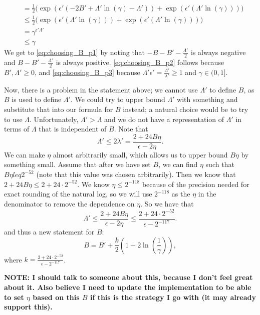 \documentclass[11pt]{scrartcl} %
\begin{document}
\begin{align}
							  &= \frac{1}{2} \bigg( \exp \left( \epsilon' \left( -2B' + \Lambda' \ln(\gamma) - \Lambda'  \right) \right) + \exp\left( \epsilon' \left( \Lambda' \ln(\gamma) \right) \right) \bigg) \nonumber \\
							  &\leq \frac{1}{2} \bigg( \exp \left( \epsilon' \left( \Lambda' \ln(\gamma)\right) \right) + \exp\left( \epsilon' \left( \Lambda' \ln(\gamma) \right) \right) \bigg) \label{eq:choosing_B_p2} \\
							  &= \gamma^{\epsilon' \Lambda'} \nonumber \\
							  &\leq \gamma \label{eq:choosing_B_p3}
\end{align}
We get to \eqref{eq:choosing_B_p1} by noting that $-B-B'-\frac{\Lambda'}{2}$ is always negative and
$B-B'-\frac{\Lambda'}{2}$ is always positive. \eqref{eq:choosing_B_p2} follows because
$B', \Lambda' \geq 0$, and \eqref{eq:choosing_B_p3} because
$\Lambda'\epsilon' = \frac{\Lambda'}{\lambda'} \geq 1$ and $\gamma \in (0,1]$. \newline

Now, there is a problem in the statement above; we cannot use $\Lambda'$ to define $B$, as $B$ is used
to define $\Lambda'$. We could try to upper bound $\Lambda'$ with something and substitute that into
our formula for $B$ instead; a natural choice would be to try to use $\Lambda$.
Unfortunately, $\Lambda' > \Lambda$ and we do not have a representation
of $\Lambda'$ in terms of $\Lambda$ that is independent of $B$.
Note that
\[ \Lambda' \leq 2\lambda' = \frac{2 + 24B\eta}{\epsilon - 2\eta}. \]
We can make $\eta$ almost arbitrarily small, which allows us to upper bound $B\eta$ by something small.
Assume that after we have set $B$, we can find $\eta$ such that $B\eta leq 2^{-52}$ (note that this
value was chosen arbitrarily). Then we know that $2 + 24B\eta \leq 2 + 24 \cdot 2^{-52}$.
We know $\eta \leq 2^{-118}$ because of the precision needed for exact rounding of the natural log,
so we will use $2^{-118}$ as the $\eta$ in the denominator to remove the dependence on $\eta$.
So we have that
\[ \Lambda' \leq \frac{2 + 24B\eta}{\epsilon-2\eta} \leq \frac{2+24 \cdot 2^{-52}}{\epsilon - 2^{-117}}. \]
and thus a new statement for $B$:
\[ B = B' + \frac{k}{2} \left(1 + 2\ln \left( \frac{1}{\gamma} \right) \right), \]
where $k = \frac{2+24 \cdot 2^{-52}}{\epsilon - 2^{-117}}$.

\textbf{NOTE: I should talk to someone about this, because I don't feel great about it. Also believe I need to update the implementation to
		      be able to set $\eta$ based on this $B$ if this is the strategy I go with (it may already support this).}
\end{document}
